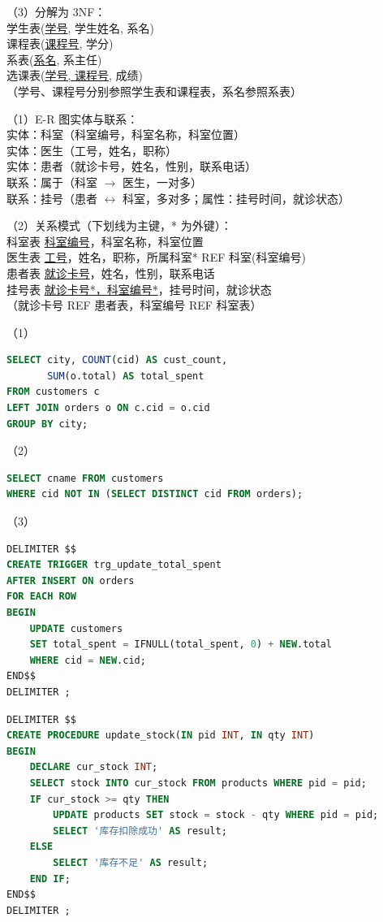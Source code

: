 \documentclass[a4paper,11pt]{article}
\begin{document}
\par（3）分解为 3NF：\\
学生表(\underline{学号}, 学生姓名, 系名)\\
课程表(\underline{课程号}, 学分)\\
系表(\underline{系名}, 系主任)\\
选课表(\underline{学号, 课程号}, 成绩)\\
（学号、课程号分别参照学生表和课程表，系名参照系表）


\q （1）E-R 图实体与联系：\\
实体：科室（科室编号，科室名称，科室位置）\\
实体：医生（工号，姓名，职称）\\
实体：患者（就诊卡号，姓名，性别，联系电话）\\
联系：属于（科室 $\to$ 医生，一对多）\\
联系：挂号（患者 $\leftrightarrow$ 科室，多对多；属性：挂号时间，就诊状态）

\par（2）关系模式（下划线为主键，* 为外键）：\\
科室表 \underline{科室编号}，科室名称，科室位置\\
医生表 \underline{工号}，姓名，职称，所属科室* REF 科室(科室编号)\\
患者表 \underline{就诊卡号}，姓名，性别，联系电话\\
挂号表 \underline{就诊卡号*，科室编号*}，挂号时间，就诊状态\\
（就诊卡号 REF 患者表，科室编号 REF 科室表）


\q
\par （1）
\begin{lstlisting}[language=SQL]
SELECT city, COUNT(cid) AS cust_count,
       SUM(o.total) AS total_spent
FROM customers c
LEFT JOIN orders o ON c.cid = o.cid
GROUP BY city;
\end{lstlisting}
\par （2）
\begin{lstlisting}[language=SQL]
SELECT cname FROM customers
WHERE cid NOT IN (SELECT DISTINCT cid FROM orders);
\end{lstlisting}
\par （3）
\begin{lstlisting}[language=SQL]
DELIMITER $$
CREATE TRIGGER trg_update_total_spent
AFTER INSERT ON orders
FOR EACH ROW
BEGIN
    UPDATE customers
    SET total_spent = IFNULL(total_spent, 0) + NEW.total
    WHERE cid = NEW.cid;
END$$
DELIMITER ;
\end{lstlisting}

\q
\begin{lstlisting}[language=SQL]
DELIMITER $$
CREATE PROCEDURE update_stock(IN pid INT, IN qty INT)
BEGIN
    DECLARE cur_stock INT;
    SELECT stock INTO cur_stock FROM products WHERE pid = pid;
    IF cur_stock >= qty THEN
        UPDATE products SET stock = stock - qty WHERE pid = pid;
        SELECT '库存扣除成功' AS result;
    ELSE
        SELECT '库存不足' AS result;
    END IF;
END$$
DELIMITER ;
\end{lstlisting}
\end{document}
